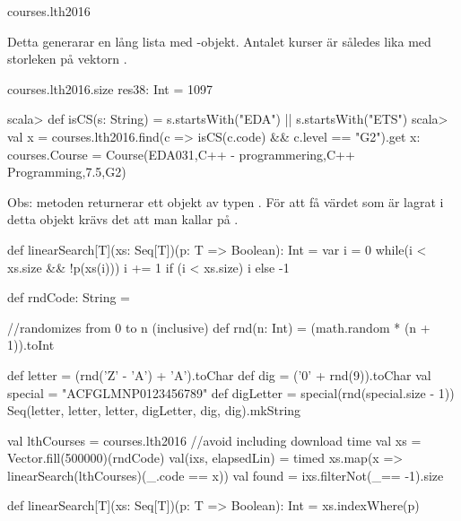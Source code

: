 \begin{REPLnonum}
courses.lth2016
\end{REPLnonum}
Detta generarar en lång lista med -objekt. Antalet kurser är således lika med storleken på vektorn .

\begin{REPLnonum}
courses.lth2016.size
res38: Int = 1097
\end{REPLnonum}

\SubtaskSolved
\begin{REPL}
scala> def isCS(s: String) = s.startsWith("EDA") || s.startsWith("ETS")
scala> val x = courses.lth2016.find(c => isCS(c.code) && c.level == "G2").get
x: courses.Course = Course(EDA031,C++ - programmering,C++ Programming,7.5,G2)
\end{REPL}
Obs: metoden  returnerar ett objekt av typen . För att få värdet som är lagrat i detta objekt krävs det att man kallar på .

\SubtaskSolved
\begin{Code}
def linearSearch[T](xs: Seq[T])(p: T => Boolean): Int = {
   var i = 0
   while(i < xs.size && !p(xs(i))) i += 1
   if (i < xs.size) i else -1
}
\end{Code}

\SubtaskSolved

\begin{Code}[language=Scala]
def rndCode: String = {
   //randomizes from 0 to n (inclusive)
   def rnd(n: Int) = (math.random * (n + 1)).toInt

   def letter = (rnd('Z' - 'A') + 'A').toChar
   def dig = ('0' + rnd(9)).toChar
   val special = "ACFGLMNP0123456789"
   def digLetter = special(rnd(special.size - 1))
   Seq(letter, letter, letter, digLetter, dig, dig).mkString
}
\end{Code}

\SubtaskSolved

\begin{Code}
val lthCourses = courses.lth2016 //avoid including download time
val xs = Vector.fill(500000)(rndCode)
val(ixs, elapsedLin) = timed{
xs.map(x => linearSearch(lthCourses)(_.code == x))}
val found = ixs.filterNot(_== -1).size
\end{Code}

\SubtaskSolved

\begin{Code}
def linearSearch[T](xs: Seq[T])(p: T => Boolean): Int =
  xs.indexWhere(p)
\end{Code}




